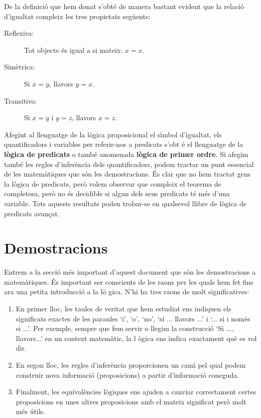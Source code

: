 De la definici\'{o} que hem donat s'obt\'{e} de manera bastant evident que
la relaci\'{o} d'igualtat compleix les tres propietats seg\"{u}ents:

\begin{description}
\item[Reflexiva:] Tot objecte \'{e}s igual a si mateix: $x=x$.

\item[Sim\`{e}trica:] Si $x=y$, llavors $y=x$.

\item[Transitiva:] Si $x=y$ i $y=z$, llavors $x=z$.
\end{description}

Afegint al llenguatge de la l\`{o}gica proposicional el s\'{\i}mbol
d'igualtat, els quantificadors i variables per referir-nos a predicats s'obt%
\'{e} el llenguatge de la \textbf{l\`{o}gica de predicats} o tamb\'{e}
anomenada \textbf{l\`{o}gica de primer ordre}. Si afegim tamb\'{e} les
regles d'infer\`{e}ncia dels quantificadors, podem tractar un punt essencial
de les matem\`{a}tiques que s\'{o}n les demostracions. \'{E}s clar que no
hem tractat gens la l\`{o}gica de predicats, per\`{o} volem observar que
compleix el teorema de completesa, per\`{o} no \'{e}s decidible si algun
dels seus predicats t\'{e} m\'{e}s d'una variable. Tots aquests resultats
poden trobar-se en qualsevol llibre de l\`{o}gica de predicats avan\c{c}at.

\section{Demostracions}

Entrem a la secci\'{o} m\'{e}s important d'aquest document que s\'{o}n les
demostracions a matem\`{a}tiques. \'{E}s important ser conscients de les
raons per les quals hem fet fins ara una petita introducci\'{o} a la l\`{o}%
gica. N'hi ha tres raons de molt significatives:

\begin{enumerate}
\item En primer lloc, les taules de veritat que hem estudiat ens indiquen
els significats exactes de les paraules `i', `o', `no', `si ... llavors ...'
i `... si i nom\'{e}s si ...'. Per exemple, sempre que fem servir o llegim
la construcci\'{o} `Si ..., llavors...' en un context matem\`{a}tic, la l%
\`{o}gica ens indica exactament qu\`{e} es vol dir.

\item En segon lloc, les regles d'infer\`{e}ncia proporcionen un cam\'{\i}
pel qual podem construir nova informaci\'{o} (proposicions) a partir
d'informaci\'{o} coneguda.

\item Finalment, les equival\`{e}ncies l\`{o}giques ens ajuden a canviar
correctament certes proposicions en unes altres proposicions amb el mateix
significat per\`{o} molt m\'{e}s \'{u}tils.
\end{enumerate}

